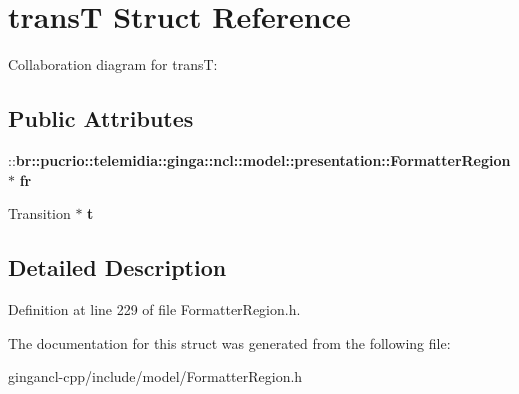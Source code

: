 \section{transT Struct Reference}
\label{structtransT}
Collaboration diagram for transT:\subsection*{Public Attributes}
\begin{CompactItemize}
\item 
::{\bf br::pucrio::telemidia::ginga::ncl::model::presentation::FormatterRegion} $\ast$ {\bf fr}\label{structtransT_8b60e96ea95fa20caa8f6f9658872be3}

\item 
Transition $\ast$ {\bf t}\label{structtransT_1658e29e533f34c3c78f78fb19be088f}

\end{CompactItemize}


\subsection{Detailed Description}




Definition at line 229 of file FormatterRegion.h.

The documentation for this struct was generated from the following file:\begin{CompactItemize}
\item 
gingancl-cpp/include/model/FormatterRegion.h\end{CompactItemize}
